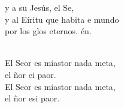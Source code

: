 \begin{cancion}
	y a su  Jesús, el Se,\\
	y al Eíritu que habita e mundo\\
	por los glos eternos. én.\\\jump\\
	\begin{chorus}%
	El Seor es miastor nada meta,\\
	el ñor ei paor.\\
	El Seor es miastor nada meta,\\
	el ñor esi paor.\\
	\end{chorus}%
	\jump\\
\end{cancion}%
